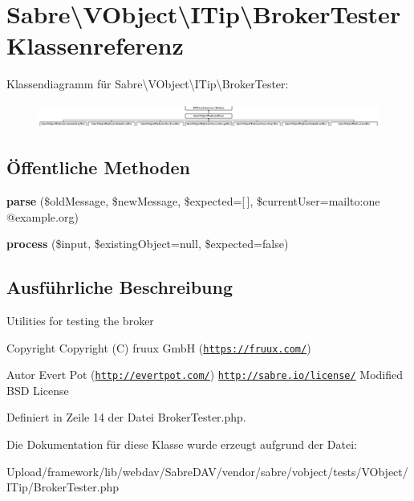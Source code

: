 \hypertarget{class_sabre_1_1_v_object_1_1_i_tip_1_1_broker_tester}{}\section{Sabre\textbackslash{}V\+Object\textbackslash{}I\+Tip\textbackslash{}Broker\+Tester Klassenreferenz}
\label{class_sabre_1_1_v_object_1_1_i_tip_1_1_broker_tester}
Klassendiagramm für Sabre\textbackslash{}V\+Object\textbackslash{}I\+Tip\textbackslash{}Broker\+Tester\+:\begin{figure}[H]
\begin{center}
\leavevmode
\includegraphics[height=0.827586cm]{class_sabre_1_1_v_object_1_1_i_tip_1_1_broker_tester}
\end{center}
\end{figure}
\subsection*{Öffentliche Methoden}
\begin{DoxyCompactItemize}
\item 
\mbox{\label{class_sabre_1_1_v_object_1_1_i_tip_1_1_broker_tester_a21a49e47bd5f045a0c231788f1ba7b8d}} 
{\bfseries parse} (\$old\+Message, \$new\+Message, \$expected=\mbox{[}$\,$\mbox{]}, \$current\+User=\textquotesingle{}mailto\+:one @example.\+org\textquotesingle{})
\item 
\mbox{\label{class_sabre_1_1_v_object_1_1_i_tip_1_1_broker_tester_a54d3de5ed49bfe9ece9654a5bd905498}} 
{\bfseries process} (\$input, \$existing\+Object=null, \$expected=false)
\end{DoxyCompactItemize}


\subsection{Ausführliche Beschreibung}
Utilities for testing the broker

\begin{DoxyCopyright}{Copyright}
Copyright (C) fruux GmbH (\href{https://fruux.com/}{\tt https\+://fruux.\+com/}) 
\end{DoxyCopyright}
\begin{DoxyAuthor}{Autor}
Evert Pot (\href{http://evertpot.com/}{\tt http\+://evertpot.\+com/})  \href{http://sabre.io/license/}{\tt http\+://sabre.\+io/license/} Modified B\+SD License 
\end{DoxyAuthor}


Definiert in Zeile 14 der Datei Broker\+Tester.\+php.



Die Dokumentation für diese Klasse wurde erzeugt aufgrund der Datei\+:\begin{DoxyCompactItemize}
\item 
Upload/framework/lib/webdav/\+Sabre\+D\+A\+V/vendor/sabre/vobject/tests/\+V\+Object/\+I\+Tip/Broker\+Tester.\+php\end{DoxyCompactItemize}
